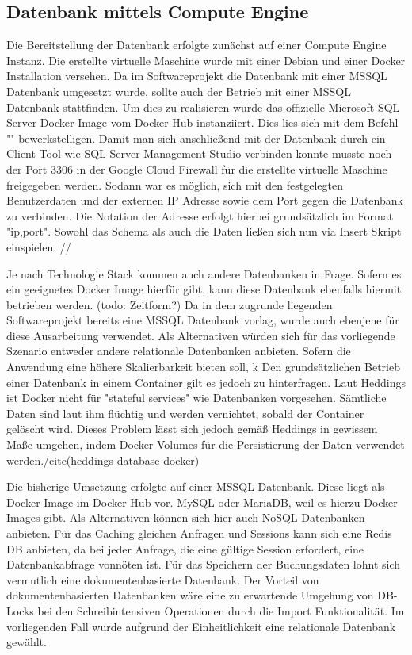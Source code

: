 \documentclass[pdftex,a4paper,abstracton,11pt,parskip=half,bibtotocnumbered]{scrartcl}
\begin{document}
	\subsection{Datenbank mittels Compute Engine}
		Die Bereitstellung der Datenbank erfolgte zunächst auf einer Compute Engine Instanz. Die erstellte virtuelle Maschine wurde mit einer Debian und einer Docker Installation versehen. Da im Softwareprojekt die Datenbank mit einer MSSQL Datenbank umgesetzt wurde, sollte auch der Betrieb mit einer MSSQL Datenbank stattfinden. Um dies zu realisieren wurde das offizielle Microsoft SQL Server Docker Image vom Docker Hub instanziiert. Dies lies sich mit dem Befehl "" bewerkstelligen. Damit man sich anschließend mit der Datenbank durch ein Client Tool wie SQL Server Management Studio verbinden konnte musste noch der Port 3306 in der Google Cloud Firewall für die erstellte virtuelle Maschine freigegeben werden. Sodann war es möglich, sich mit den festgelegten Benutzerdaten und der externen IP Adresse sowie dem Port gegen die Datenbank zu verbinden. Die Notation der Adresse erfolgt hierbei grundsätzlich im Format "ip,port". Sowohl das Schema als auch die Daten ließen sich nun via Insert Skript einspielen. //
		
		
		Je nach Technologie Stack kommen auch andere Datenbanken in Frage. Sofern es ein geeignetes Docker Image hierfür gibt, kann diese Datenbank ebenfalls hiermit betrieben werden. (todo: Zeitform?) Da in dem zugrunde liegenden Softwareprojekt bereits eine MSSQL Datenbank vorlag, wurde auch ebenjene für diese Ausarbeitung verwendet. Als Alternativen würden sich für das vorliegende Szenario entweder andere relationale Datenbanken anbieten. Sofern die Anwendung eine höhere Skalierbarkeit bieten soll, k
		Den grundsätzlichen Betrieb einer Datenbank in einem Container gilt es jedoch zu hinterfragen. Laut Heddings ist Docker nicht für "stateful services" wie Datenbanken vorgesehen. Sämtliche Daten sind laut ihm flüchtig und werden vernichtet, sobald der Container gelöscht wird. Dieses Problem lässt sich jedoch gemäß Heddings in gewissem Maße umgehen, indem Docker Volumes für die Persistierung der Daten verwendet werden./cite(heddings-database-docker) 
		
		
		
		Die bisherige Umsetzung erfolgte auf einer MSSQL Datenbank. Diese liegt als Docker Image im Docker Hub vor.
		MySQL oder MariaDB, weil es hierzu Docker Images gibt. Als Alternativen können sich hier auch NoSQL Datenbanken anbieten. Für das Caching
		gleichen Anfragen und Sessions kann sich eine Redis DB anbieten, da bei jeder Anfrage, die eine gültige Session erfordert, eine Datenbankabfrage
		vonnöten ist. Für das Speichern der Buchungsdaten lohnt sich vermutlich eine dokumentenbasierte Datenbank. Der Vorteil von dokumentenbasierten 
		Datenbanken wäre eine zu erwartende Umgehung von DB-Locks bei den Schreibintensiven Operationen durch die Import Funktionalität. Im vorliegenden
		Fall wurde aufgrund der Einheitlichkeit eine relationale Datenbank gewählt. 
		
\end{document}
